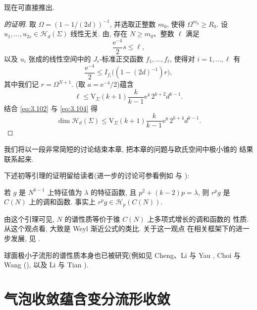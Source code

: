  现在可直接推出.

\begin{proof}[ 的证明]
取 $\Omega=(1-1/(2d))^{-1}$, 并选取正整数 $m_0$, 使得
$\Omega^{m_0}\geq R_0$. 设 $u_1,\dots,u_{2s}\in\mathcal{H}_d(\Sigma)$
线性无关. 由, 存在 $N\geq m_0$、整数 $\ell$ 满足
\begin{equation}
\frac{\mathrm{e}^{-4}}{2}s\leq\ell,
\label{eq:3.102}
\end{equation}
以及 $u_i$ 张成的线性空间中的 $J_r$-标准正交函数
$f_1,\dots,f_\ell$, 使得对 $i=1,\dots,\ell$ 有
\begin{equation}
\frac{\mathrm{e}^{-4}}{2}\leq I_{f_i}\bigl((1-(2d)^{-1})r\bigr),
\label{eq:3.103}
\end{equation}
其中我们记 $r=\Omega^{N+1}$. (取 $a=\mathrm{e}^{-4}/2$)蕴含
\begin{equation}
\ell\leq\mathrm{V}_\Sigma(k+1)\frac{k}{k-1}
 \mathrm{e}^4\,2^{k+2}d^{k-1}.
\label{eq:3.104}
\end{equation}
结合 \eqref{eq:3.102} 与 \eqref{eq:3.104} 得
\begin{equation}
\dim\mathcal{H}_d(\Sigma)\leq\mathrm{V}_\Sigma(k+1)\frac{k}{k-1}
 \mathrm{e}^8\,2^{k+4}d^{k-1}.
\label{eq:3.105}
\end{equation}
\end{proof}

我们将以一段非常简短的讨论结束本章, 把本章的问题与欧氏空间中极小锥的
结果联系起来.

下述初等引理的证明留给读者(进一步的讨论可参看例如 \cite{CM11} 与
\cite{CM15}):

\begin{lemma}
\label{lem:3.24}
若 $g$ 是 $N^{k-1}$ 上特征值为 $\lambda$ 的特征函数, 且
$p^2+(k-2)p=\lambda$, 则 $r^pg$ 是 $C(N)$ 上的调和函数. 事实上
$r^pg\in\mathcal{H}_p(C(N))$.
\end{lemma}

由这个引理可见, $N$ 的谱性质等价于锥 $C(N)$ 上多项式增长的调和函数的
性质. 从这个观点看,  大致是 Weyl 渐近公式的类比. 关于这一观点
在相关框架下的进一步发展, 见 \cite{CM15}.

球面极小子流形的谱性质本身也已被研究(例如见 Cheng、Li 与 Yau
\cite{CgLiYa}, Choi 与 Wang \cite{CiWa}(), 以及 Li 与 Tian
\cite{LiTi}).

\section{气泡收敛蕴含变分流形收敛}
\label{sec:3.6}

